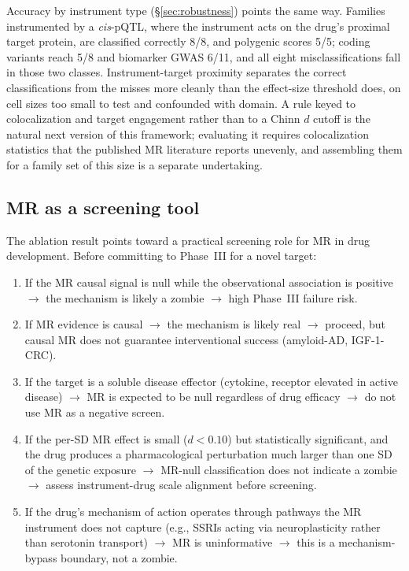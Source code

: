 \documentclass[11pt]{article}
\begin{document}
Accuracy by instrument type (\S\ref{sec:robustness}) points the same way. Families instrumented by a \emph{cis}-pQTL, where the instrument acts on the drug's proximal target protein, are classified correctly 8/8, and polygenic scores 5/5; coding variants reach 5/8 and biomarker GWAS 6/11, and all eight misclassifications fall in those two classes. Instrument-target proximity separates the correct classifications from the misses more cleanly than the effect-size threshold does, on cell sizes too small to test and confounded with domain. A rule keyed to colocalization and target engagement rather than to a Chinn $d$ cutoff is the natural next version of this framework; evaluating it requires colocalization statistics that the published MR literature reports unevenly, and assembling them for a family set of this size is a separate undertaking.

\subsection{MR as a screening tool}

The ablation result points toward a practical screening role for MR in drug development. Before committing to Phase~III for a novel target:

\begin{enumerate}
\item If the MR causal signal is null while the observational association is positive $\to$ the mechanism is likely a zombie $\to$ high Phase~III failure risk.
\item If MR evidence is causal $\to$ the mechanism is likely real $\to$ proceed, but causal MR does not guarantee interventional success (amyloid-AD, IGF-1-CRC).
\item If the target is a soluble disease effector (cytokine, receptor elevated in active disease) $\to$ MR is expected to be null regardless of drug efficacy $\to$ do not use MR as a negative screen.
\item If the per-SD MR effect is small ($d < 0.10$) but statistically significant, and the drug produces a pharmacological perturbation much larger than one SD of the genetic exposure $\to$ MR-null classification does not indicate a zombie $\to$ assess instrument-drug scale alignment before screening.
\item If the drug's mechanism of action operates through pathways the MR instrument does not capture (e.g., SSRIs acting via neuroplasticity rather than serotonin transport) $\to$ MR is uninformative $\to$ this is a mechanism-bypass boundary, not a zombie.
\end{enumerate}
\end{document}
